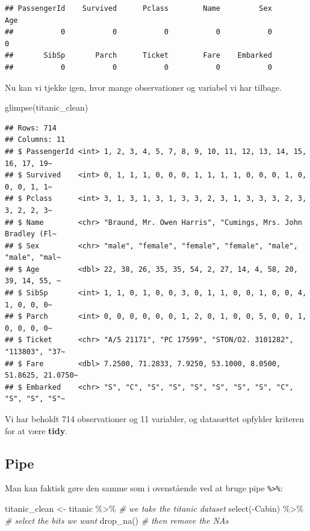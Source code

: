 \documentclass[
]{book}
\newenvironment{Shaded}{\begin{snugshade}}{\end{snugshade}}
\newcommand{\CommentTok}[1]{\textcolor[rgb]{0.56,0.35,0.01}{\textit{#1}}}
\newcommand{\FunctionTok}[1]{\textcolor[rgb]{0.00,0.00,0.00}{#1}}
\newcommand{\NormalTok}[1]{#1}
\newcommand{\OtherTok}[1]{\textcolor[rgb]{0.56,0.35,0.01}{#1}}
\newcommand{\SpecialCharTok}[1]{\textcolor[rgb]{0.00,0.00,0.00}{#1}}
\begin{document}
\begin{verbatim}
## PassengerId    Survived      Pclass        Name         Sex         Age 
##           0           0           0           0           0           0 
##       SibSp       Parch      Ticket        Fare    Embarked 
##           0           0           0           0           0
\end{verbatim}

Nu kan vi tjekke igen, hvor mange observationer og variabel vi har tilbage.

\begin{Shaded}
\begin{Highlighting}[]
\FunctionTok{glimpse}\NormalTok{(titanic\_clean)}
\end{Highlighting}
\end{Shaded}

\begin{verbatim}
## Rows: 714
## Columns: 11
## $ PassengerId <int> 1, 2, 3, 4, 5, 7, 8, 9, 10, 11, 12, 13, 14, 15, 16, 17, 19~
## $ Survived    <int> 0, 1, 1, 1, 0, 0, 0, 1, 1, 1, 1, 0, 0, 0, 1, 0, 0, 0, 1, 1~
## $ Pclass      <int> 3, 1, 3, 1, 3, 1, 3, 3, 2, 3, 1, 3, 3, 3, 2, 3, 3, 2, 2, 3~
## $ Name        <chr> "Braund, Mr. Owen Harris", "Cumings, Mrs. John Bradley (Fl~
## $ Sex         <chr> "male", "female", "female", "female", "male", "male", "mal~
## $ Age         <dbl> 22, 38, 26, 35, 35, 54, 2, 27, 14, 4, 58, 20, 39, 14, 55, ~
## $ SibSp       <int> 1, 1, 0, 1, 0, 0, 3, 0, 1, 1, 0, 0, 1, 0, 0, 4, 1, 0, 0, 0~
## $ Parch       <int> 0, 0, 0, 0, 0, 0, 1, 2, 0, 1, 0, 0, 5, 0, 0, 1, 0, 0, 0, 0~
## $ Ticket      <chr> "A/5 21171", "PC 17599", "STON/O2. 3101282", "113803", "37~
## $ Fare        <dbl> 7.2500, 71.2833, 7.9250, 53.1000, 8.0500, 51.8625, 21.0750~
## $ Embarked    <chr> "S", "C", "S", "S", "S", "S", "S", "S", "C", "S", "S", "S"~
\end{verbatim}

Vi har beholdt 714 observationer og 11 variabler, og datasættet opfylder kriteren for at være \textbf{tidy}.

\hypertarget{pipe}{%
\subsection{Pipe}\label{pipe}}

Man kan faktisk gøre den samme som i ovenstående ved at bruge pipe \texttt{\%\textgreater{}\%}:

\begin{Shaded}
\begin{Highlighting}[]
\NormalTok{titanic\_clean }\OtherTok{\textless{}{-}}\NormalTok{ titanic }\SpecialCharTok{\%\textgreater{}\%} \CommentTok{\# we take the titanic dataset}
    \FunctionTok{select}\NormalTok{(}\SpecialCharTok{{-}}\NormalTok{Cabin) }\SpecialCharTok{\%\textgreater{}\%} \CommentTok{\# select the bits we want}
    \FunctionTok{drop\_na}\NormalTok{() }\CommentTok{\# then remove the NAs}
\end{Highlighting}
\end{Shaded}
\end{document}
